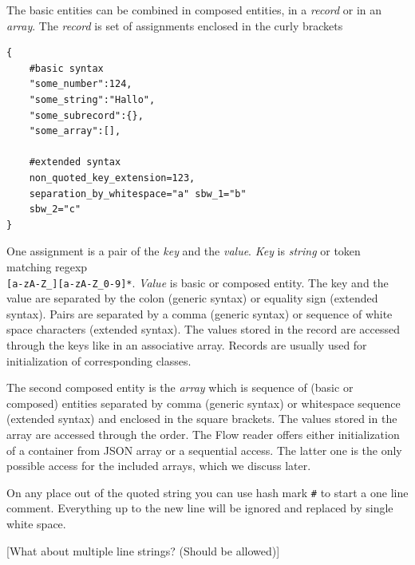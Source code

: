 \documentclass[12pt,a4paper]{report}
\begin{document}
The basic entities can be combined in composed entities, in a {\it record} or in an {\it array}. The {\it record} is set of assignments enclosed in the curly brackets
\begin{verbatim}
{
	#basic syntax
	"some_number":124, 
	"some_string":"Hallo",
	"some_subrecord":{},
	"some_array":[],
	
	#extended syntax
	non_quoted_key_extension=123,
	separation_by_whitespace="a" sbw_1="b"
	sbw_2="c"
}
\end{verbatim}
One assignment is a pair of the {\it key} and the {\it value}. {\it Key} is {\it string} or token matching regexp\\
\verb'[a-zA-Z_][a-zA-Z_0-9]*'.
{\it Value} is basic or composed entity.
The key and the value are separated by the colon (generic syntax) or equality sign (extended syntax). Pairs are separated by a comma (generic syntax) or 
sequence of white space characters (extended syntax). The values stored in the record are accessed through the keys like in an associative array. Records are usually used for initialization of corresponding classes.

The second composed entity is the {\it array} which is sequence of (basic or composed) entities separated by comma (generic syntax) or whitespace sequence 
(extended syntax) and enclosed in the square brackets. 
The values stored in the array are accessed through the order. The Flow reader offers either initialization of a container from JSON array or
a sequential access. The latter one is the only possible access for the included arrays, which we discuss later.

On any place out of the quoted string you can use hash mark \verb'#' 
to start a one line comment. Everything up to the new line will be ignored and replaced by single white space.

[What about multiple line strings? (Should be allowed)]
\end{document}
